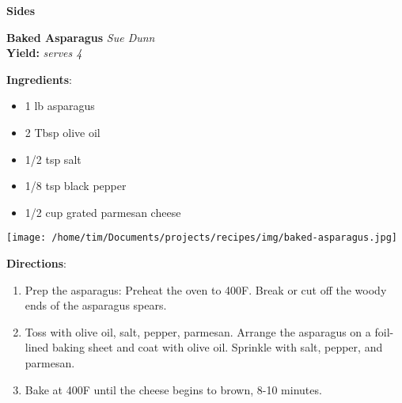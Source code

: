 \documentclass[11pt, twoside, openany]{book}
\begin{document}
{\newpage \LARGE \textbf{Sides}} \label{sides}\vspace{4mm}\\
\noindent\begin{minipage}[t]{\linewidth}%
{\Large\textbf{Baked Asparagus}} \label{baked-asparagus}\hfill\textit{Sue Dunn}\\
\textbf{Yield:} \textit{serves 4}\\
\noindent\begin{minipage}[t]{0.78\linewidth}%
\textbf{Ingredients}:\vspace{-3mm}
\begin{multicols}{2}
\begin{itemize}\setlength\itemsep{-1mm}
\item 1 lb asparagus
\item 2 Tbsp olive oil
\item 1/2 tsp salt
\item 1/8 tsp black pepper
\item 1/2 cup grated parmesan cheese
\end{itemize}
\end{multicols}
\end{minipage}
\noindent\begin{minipage}[t]{0.18\linewidth}
\centering \strut\vspace*{-\baselineskip}\newline
\texttt{[image: /home/tim/Documents/projects/recipes/img/baked-asparagus.jpg]}\\
\end{minipage}\vspace{3mm}
\textbf{Directions}:
\vspace{-3mm}\begin{enumerate}\setlength\itemsep{-1mm}
\item Prep the asparagus: Preheat the oven to 400F. Break or cut off the woody ends of the asparagus spears.
\item Toss with olive oil, salt, pepper, parmesan. Arrange the asparagus on a foil-lined baking sheet and coat with olive oil. Sprinkle with salt, pepper, and parmesan.
\item Bake at 400F until the cheese begins to brown, 8-10 minutes.
\end{enumerate}
\end{minipage}\vspace{8mm}
\end{document}
